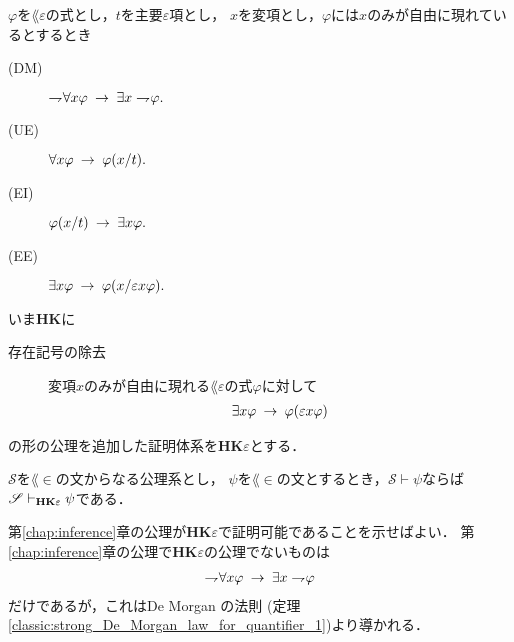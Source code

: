	\begin{screen}
		\begin{logicalaxm}
			$\varphi$を$\lang{\varepsilon}の$式とし，$t$を主要$\varepsilon$項とし，
			$x$を変項とし，$\varphi$には$x$のみが自由に現れているとするとき
			\begin{description}
				\item[(DM)] $\rightharpoondown\hspace{-0.25em} \forall x \varphi
					\hspace{0.25em}\rightarrow\hspace{0.25em} \exists x \rightharpoondown\hspace{-0.25em} \varphi.$
				
				\item[(UE)] $\forall x \varphi \hspace{0.25em}\rightarrow\hspace{0.25em} \varphi(x/t).$
				
				\item[(EI)] $\varphi(x/t) \hspace{0.25em}\rightarrow\hspace{0.25em} \exists x \varphi.$
				
				\item[(EE)] $\exists x \varphi \hspace{0.25em}\rightarrow\hspace{0.25em} \varphi(x/\varepsilon x \varphi).$
			\end{description}
		\end{logicalaxm}
	\end{screen}
	
	いま{\bf HK}に
	\begin{description}
		\item[存在記号の除去] 
			変項$x$のみが自由に現れる$\lang{\varepsilon}$の式$\varphi$に対して
			\begin{align}
				\exists x \varphi \hspace{0.25em}\rightarrow\hspace{0.25em} \varphi(\varepsilon x \varphi)
			\end{align}
	\end{description}
	の形の公理を追加した証明体系を{\bf HK$\varepsilon$}とする．
	
	\begin{screen}
		\begin{metathm}
		\label{metathm:Henkin_expansion_1}
			$\mathscr{S}$を$\lang{\in}$の文からなる公理系とし，
			$\psi$を$\lang{\in}$の文とするとき，$\mathscr{S} \vdash \psi$ならば
			$\mathscr{S} \vdash_{{\scriptsize \mbox{{\bf HK$\varepsilon$}}}} \psi$である．
		\end{metathm}
	\end{screen}
	
	\begin{metaprf}
		第\ref{chap:inference}章の公理が{\bf HK$\varepsilon$}で証明可能であることを示せばよい．
		第\ref{chap:inference}章の公理で{\bf HK$\varepsilon$}の公理でないものは
		\begin{align}
			\rightharpoondown\hspace{-0.25em} \forall x \varphi \hspace{0.25em}\rightarrow\hspace{0.25em} \exists x \rightharpoondown\hspace{-0.25em} \varphi
		\end{align}
		だけであるが，これはDe Morgan の法則
		(定理\ref{classic:strong_De_Morgan_law_for_quantifier_1})より導かれる．
		\QED
	\end{metaprf}
	
